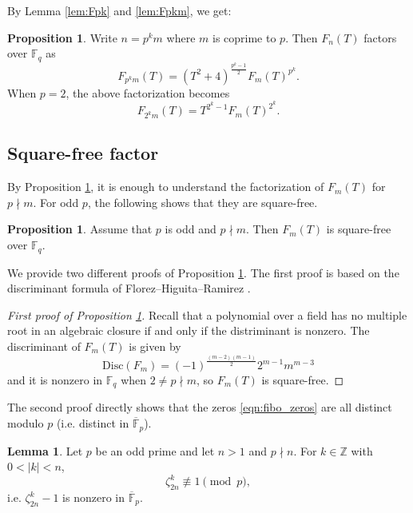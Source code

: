 \documentclass[letterpaper, 10pt]{article}
\newcommand{\bF}{\mathbb{F}}
\newcommand{\1}{\mathds{1}}	%
\theoremstyle{definition}
\newtheorem{proposition}[theorem]{Proposition}
\newtheorem{lemma}[theorem]{Lemma}
\theoremstyle{remark}
\begin{document}
By Lemma \ref{lem:Fpk} and \ref{lem:Fpkm}, we get:

\begin{proposition}
\label{prop:Fpkm}
    Write \(n = p^k m\) where \(m\) is coprime to \(p\). Then \(F_n(T)\) factors over \(\bF_q\) as
    \begin{equation}
    \label{eqn:Fpkmfactor}
        F_{p^k m}(T) = (T^2 + 4)^{\frac{p^k - 1}{2}} F_m(T)^{p^k}.
    \end{equation}
    When $p = 2$, the above factorization becomes
    \begin{equation}
        \label{eqn:F2kmfactor}
        F_{2^k m}(T) = T^{2^k - 1} F_m(T)^{2^k}.
    \end{equation}
\end{proposition}

\subsection{Square-free factor}

By Proposition \ref{prop:Fpkm}, it is enough to understand the factorization of $F_m(T)$ for $p \nmid m$.
For odd $p$, the following shows that they are square-free. 
\begin{proposition}
\label{prop:Fmsqfree}
    Assume that \(p\) is odd and \(p \nmid m\). Then \(F_m(T)\) is square-free over \(\bF_q\).
\end{proposition}

We provide two different proofs of Proposition \ref{prop:Fmsqfree}.
The first proof is based on the discriminant formula of Florez--Higuita--Ramirez \cite{florez2019resultant}.

\begin{proof}[First proof of Proposition \ref{prop:Fmsqfree}]
    Recall that a polynomial over a field has no multiple root in an algebraic closure if and only if the distriminant is nonzero.
    The discriminant of \(F_m(T)\) is given by \cite[Theorem 4]{florez2019resultant}
    \[
        \mathrm{Disc}(F_m) = (-1)^{\frac{(m-2)(m-1)}{2}} 2^{m-1} m^{m-3}
    \]
    and it is nonzero in \(\bF_q\) when \(2 \ne p \nmid m\), so \(F_m(T)\) is square-free.
\end{proof}

The second proof directly shows that the zeros \eqref{eqn:fibo_zeros} are all distinct modulo $p$ (i.e. distinct in $\overline{\mathbb{F}}_p$).

\begin{lemma} \label{distinct}
Let $p$ be an odd prime and let $n > 1$ and $p \nmid n$. For $k \in \mathbb{Z}$ with $0 < |k| < n$,
$$\zeta_{2n}^k \not \equiv 1 \pmod p,$$
i.e. $\zeta_{2n}^k - 1$ is nonzero in $\overline{\bF}_p$.
\end{lemma}
\end{document}
